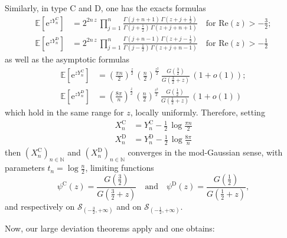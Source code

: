 \documentclass[12pt,a4paper,reqno]{amsart}
\theoremstyle{remark}
\newcommand{\N}{\mathbb{N}}
\newcommand{\E}{\mathrm{e}}
\newcommand{\esper}{\mathbb{E}}
\renewcommand{\Re}{\mathrm{Re}}
\begin{document}
Similarly, in type $\mathrm{C}$ and $\mathrm{D}$, one has the exacts formulas
\begin{align*}
\esper\!\left[\E^{zY_n^{\mathrm{C}}}\right] &= 2^{2n\,z}\,\prod_{j=1}^n \frac{\Gamma(j+n+1)\,\Gamma(z+j+\frac{1}{2})}{\Gamma(j+\frac{1}{2})\,\Gamma(z+j+n+1)}\quad\text{for }\Re(z)>-\frac{3}{2};\\
\esper\!\left[\E^{zY_n^{\mathrm{D}}}\right] &= 2^{2n\,z}\,\prod_{j=1}^n \frac{\Gamma(j+n-1)\,\Gamma(z+j-\frac{1}{2})}{\Gamma(j-\frac{1}{2})\,\Gamma(z+j+n-1)}\quad\text{for }\Re(z)>-\frac{1}{2}
\end{align*}
as well as the asymptotic formulas
\begin{align*}
\esper\!\left[\E^{zY_n^{\mathrm{C}}}\right] &= \left(\frac{\pi n}{2}\right)^{\frac{z}{2}}\,\left(\frac{n}{2}\right)^{\frac{z^2}{2}}\,\frac{G(\frac{3}{2})}{G(\frac{3}{2}+z)}\,(1+o(1));\\
\esper\!\left[\E^{zY_n^{\mathrm{D}}}\right] &= \left(\frac{8\pi}{n}\right)^{\frac{z}{2}}\,\left(\frac{n}{2}\right)^{\frac{z^2}{2}}\,\frac{G(\frac{1}{2})}{G(\frac{1}{2}+z)}\,(1+o(1))
\end{align*}
which hold in the same range for $z$, locally uniformly. Therefore, setting
\begin{align*}
X_n^{\mathrm{C}} &= Y_n^{\mathrm{C}} - \frac{1}{2}\,\log \frac{\pi n}{2} \\
X_n^{\mathrm{D}} &= Y_n^{\mathrm{D}} - \frac{1}{2}\,\log \frac{8\pi}{n}
\end{align*}
then $(X_n^{\mathrm{C}})_{n \in \N}$ and $(X_n^{\mathrm{D}})_{n \in \N}$ converges in the mod-Gaussian sense, with parameters $t_n = \log \frac{n}{2}$, limiting functions
$$\psi^{\mathrm{C}}(z)= \frac{G(\frac{3}{2})}{G(\frac{3}{2}+z)}\quad\text{and}\quad \psi^{\mathrm{D}}(z)= \frac{G(\frac{1}{2})}{G(\frac{1}{2}+z)}, $$
and respectively on $\mathcal{S}_{(-\frac{3}{2},+\infty)}$ and on $\mathcal{S}_{(-\frac{1}{2},+\infty)}$.
\bigskip

Now, our large deviation theorems apply and one obtains:
\end{document}
